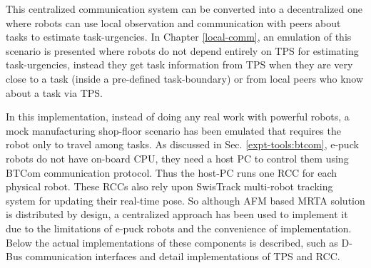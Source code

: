 This centralized communication system can be converted into a decentralized one where robots can use local observation and communication with peers about tasks to estimate task-urgencies. In Chapter \ref{local-comm}, an emulation of this scenario is presented where robots do not depend entirely on TPS for estimating task-urgencies, instead they get task information from TPS when they are very close to a task (inside a pre-defined task-boundary) or from local peers who know about a task via TPS.

In this implementation, instead of doing any real work with powerful robots,  a mock manufacturing shop-floor scenario has been emulated that requires the robot only to travel among tasks. As discussed in Sec. \ref{expt-tools:btcom}, e-puck robots do not have on-board CPU, they need a host PC to  control them using BTCom communication protocol. Thus the host-PC  runs one RCC for each physical robot. These RCCs also rely upon SwisTrack multi-robot tracking system for updating their real-time pose. So although AFM based MRTA solution is distributed by design,  a centralized approach has been used to implement it due to the limitations of e-puck robots and the convenience of implementation. Below the actual implementations of these components is described, such as D-Bus communication interfaces and detail implementations of TPS and RCC.
